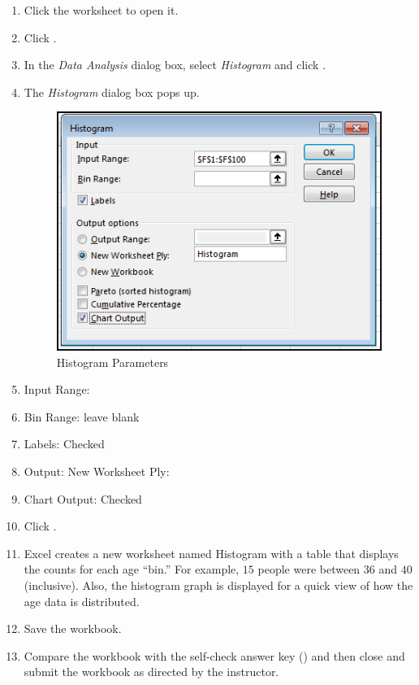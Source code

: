 \begin{enumbox}
	\begin{enumerate}
		\item Click the  worksheet to open it.
		\item Click .
		\item In the \textit{Data Analysis} dialog box, select \textit{Histogram} and click .
		\item The \textit{Histogram} dialog box pops up.

		\begin{figure}[H]
			\centering
			\includegraphics[width=\maxwidth{.75\linewidth}]{gfx/ch09_fig62}
			\caption{Histogram Parameters}
			\label{09:fig62}
		\end{figure}

		\item Input Range: 
		\item Bin Range: leave blank
		\item Labels: Checked
		\item Output: New Worksheet Ply: 
		\item Chart Output: Checked
		\item Click .
		\item Excel creates a new worksheet named Histogram with a table that displays the counts for each age ``bin.'' For example, $ 15 $ people were between $ 36 $ and $ 40 $ (inclusive). Also, the histogram graph is displayed for a quick view of how the age data is distributed.
		\item Save the  workbook.
		
		\item Compare the workbook with the self-check answer key () and then close and submit the  workbook as directed by the instructor.
	
	\end{enumerate}
\end{enumbox}
	

